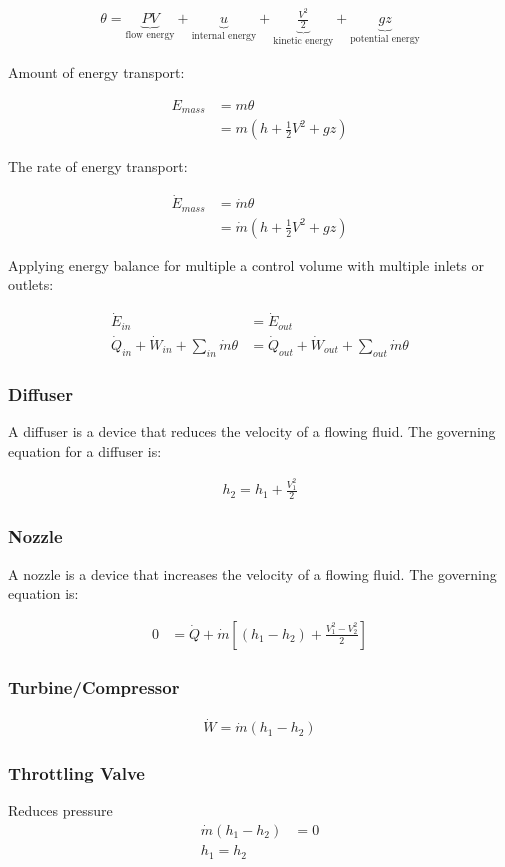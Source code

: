 \begin{align}
\theta =
\underbrace{PV}_{\text{flow energy}}
+
\underbrace{u}_{\text{internal energy}}
+
\underbrace{\frac{V^2}{2}}_{\text{kinetic energy}}
+
\underbrace{gz}_{\text{potential energy}}
\end{align}

Amount of energy transport:

\begin{align}
E_{mass} &= m\theta\\
         &= m(h+\frac12V^2+gz)
\end{align}

The rate of energy transport:


\begin{align}
\dot{E}_{mass} &= \dot{m}\theta\\
               &= \dot{m}(h+\frac12V^2+gz)
\end{align}


Applying energy balance for multiple a control volume with multiple inlets or outlets:

\begin{align}
\dot{E}_{in} &= \dot{E}_{out}\\ 
\dot{Q}_{in} + \dot{W}_{in} + \sum_{in}\dot{m}\theta &=
\dot{Q}_{out} + \dot{W}_{out} + \sum_{out}\dot{m}\theta
\end{align}

\subsubsection{Diffuser}
A diffuser is a device that reduces the velocity of a flowing fluid. The governing equation for a diffuser is:

\begin{align}
	h_2 = h_1 + \frac{V_1^2}{2}
\end{align}

\subsubsection{Nozzle}
A nozzle is a device that increases the velocity of a flowing fluid. The governing equation is:

\begin{align}
	0&=\dot{Q} + \dot{m}
	\left[
	(h_1-h_2)
	+
	\frac{V_1^2-V_2^2}{2}
	\right]
\end{align}

\subsubsection{Turbine/Compressor}

\begin{align}
	\dot{W} = \dot{m}(h_1-h_2)
\end{align}


\subsubsection{Throttling Valve}
Reduces pressure
\begin{align}
	\dot{m}(h_1-h_2)&=0\\ 
	h_1=h_2
\end{align}








